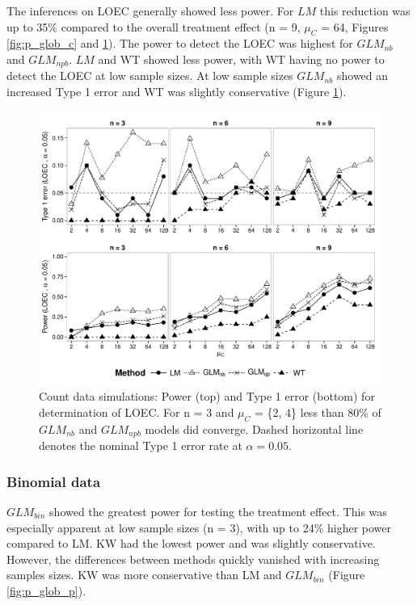 \documentclass[twocolumn, natbib]{svjour3}
\begin{document}
The inferences on LOEC generally showed less power.
For $LM$ this reduction was up to 35\% compared to the overall treatment effect (n = 9, $\mu_C$ = 64, Figures \ref{fig:p_glob_c} and \ref{fig:p_loec_c}).
The power to detect the LOEC was highest for $GLM_{nb}$ and $GLM_{npb}$. $LM$ and WT showed less power, with WT having no power to detect the LOEC at low sample sizes.
At low sample sizes $GLM_{nb}$ showed an increased Type 1 error and WT was slightly conservative (Figure \ref{fig:p_loec_c}).

\begin{figure}
  \centering
  \includegraphics[width = 129mm]{p_loec_c.pdf}
  \caption{Count data simulations: Power (top) and Type 1 error (bottom) for determination of LOEC.
  For n = 3 and $\mu_C$ = \{2, 4\} less than 80\% of $GLM_{nb}$ and $GLM_{npb}$ models did converge.
  Dashed horizontal line denotes the nominal Type 1 error rate at $\alpha = 0.05$.
  }
  \label{fig:p_loec_c}
\end{figure}


\subsubsection{Binomial data}
$GLM_{bin}$ showed the greatest power for testing the treatment effect. 
This was especially apparent at low sample sizes (n = 3), with up to 24\% higher power compared to LM.
KW had the lowest power and was slightly conservative.
However, the differences between methods quickly vanished with increasing samples sizes. 
KW was more conservative than LM and $GLM_{bin}$ (Figure \ref{fig:p_glob_p}).
\end{document}
